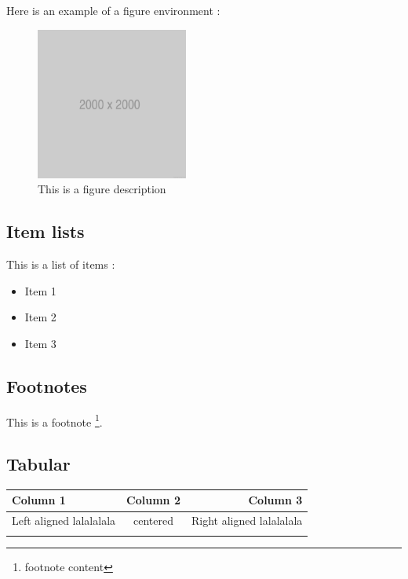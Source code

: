 Here is an example of a figure environment :

\begin{center}
    \begin{figure}[ht!]
        \centering
        
        \includegraphics[width=5cm, keepaspectratio]{imports/2000.png}
        
        \caption{This is a figure description}
    \end{figure}
\end{center}

\subsection{Item lists}

This is a list of items :

\begin{itemize}
    \item Item 1
    \item Item 2
    \item Item 3
\end{itemize}

\subsection{Footnotes}

This is a footnote \footnote{footnote content}.

\subsection{Tabular}


\begin{center}
    \begin{tabular}{|l|c|r|} %
        \hline
        \rowcolor{white!75!black} \textbf{Column 1} & \textbf{Column 2} & \textbf{Column 3} \\
        \hline
        Left aligned lalalalala & centered & Right aligned lalalalala\\
        \hline
         & & \\
        \hline
    \end{tabular}
\end{center}
\fi